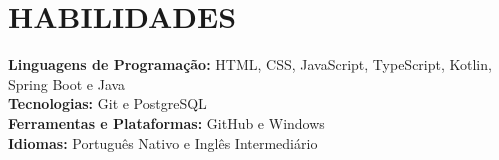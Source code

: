           

\section{HABILIDADES}
\begin{itemize}[leftmargin=0in, label={}]
	\small{\item{
		\textbf{Linguagens de Programação:}
		{HTML, CSS, JavaScript, TypeScript, Kotlin, Spring Boot e Java}
		\vspace{2pt} \\
				
		\textbf{Tecnologias:}
		{Git e PostgreSQL}
		\vspace{2pt} \\
						     
		\textbf{Ferramentas e Plataformas:}
		{GitHub e Windows}
		\vspace{2pt} \\
						     
		\textbf{Idiomas:}
		{Português Nativo e Inglês Intermediário}
	}}
\end{itemize}